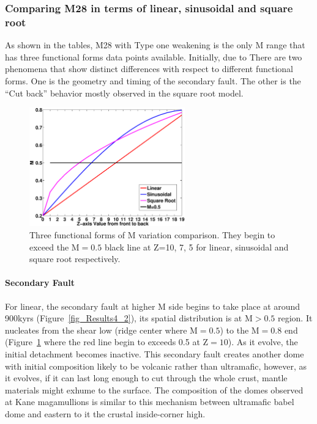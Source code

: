 \subsubsection{Comparing M28 in terms of linear, sinusoidal and square root}
As shown in the tables, M28 with Type one weakening is the only M range that has three functional forms data points available. Initially, due to There are two phenomena that show distinct differences with respect to different functional forms. One is the geometry and timing of the secondary fault. The other is the ``Cut back'' behavior mostly observed in the square root model.

\begin{figure}[hc]
  \centering
    \includegraphics[width=0.6\textwidth]{fig_Results4_1.eps}
  \caption{Three functional forms of M variation comparison. They begin to exceed the M$=0.5$ black line at Z=10, 7, 5 for linear, sinusoidal and square root respectively.}
 \label{fig_Results4_1}
\end{figure}   

\paragraph{Secondary Fault}

For linear, the secondary fault at higher M side begins to take place at around 900kyrs (Figure~\hyperref[fig_Results4_2]{\ref{fig_Results4_2}}), its spatial distribution is at M$>0.5$ region. It nucleates from the shear low (ridge center where M$=0.5$) to the M$=0.8$ end (Figure~\hyperref[fig_Results4_1]{\ref{fig_Results4_1}} where the red line begin to exceeds 0.5 at Z$=10$). As it evolve, the initial detachment becomes inactive. This secondary fault creates another dome with initial composition likely to be volcanic rather than ultramafic, however, as it evolves, if it can last long enough to cut through the whole crust, mantle materials might exhume to the surface. The composition of the domes observed at Kane magamullions is similar to this mechanism between ultramafic babel dome and eastern to it the crustal inside-corner high. 

